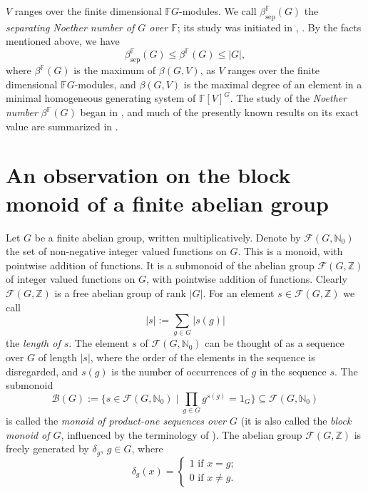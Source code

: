 \documentclass[12pt, oneside]{amsart}
\def\NN{\mathbb{N}}
\def\ZZ{\mathbb{Z}}
\def\FF{\mathbb{F}}
\def\sepbeta{\beta_{\mathrm{sep}}}
\begin{document}
$V$ ranges over the finite dimensional $\FF G$-modules.  We call $\sepbeta^\FF(G)$ the 
\emph{separating Noether number of $G$ over $\FF$}; 
its study was initiated in  \cite{kemper}, \cite{kohls-kraft}.   
By the facts mentioned above, we have 
\begin{equation}\label{eq:sepbeta<beta} 
\sepbeta^\FF(G)\le \beta^\FF(G)\le |G|,
\end{equation} 
where $\beta^\FF(G)$ is the maximum of $\beta(G,V)$, as  
$V$ ranges over the finite dimensional $\FF G$-modules, and 
$\beta(G,V)$ is the maximal degree of an element in a minimal homogeneous generating system 
of $\FF[V]^G$. The study of the \emph{Noether number} 
$\beta^\FF(G)$ began in \cite{schmid}, and much of the presently known results on its exact value 
are summarized in \cite{cziszter-domokos-szollosi}. 

\section{An observation on the block monoid of a finite abelian group}\label{sec:block monoid} 

Let $G$ be a finite abelian group, written multiplicatively. 
Denote by $\mathcal{F}(G,\NN_0)$ the set of non-negative integer valued functions on $G$. This is a monoid, with pointwise addition of functions. 
It is a submonoid of the abelian group $\mathcal{F}(G,\ZZ)$ of integer valued functions on $G$, with pointwise addition of functions. 
Clearly $\mathcal{F}(G,\ZZ)$ is a free abelian group of rank $|G|$. 
For an element $s\in \mathcal{F}(G,\ZZ)$ we call 
\[|s|:=\sum_{g\in G}|s(g)|\]
the \emph{length of $s$}.  
The element $s$ of $\mathcal{F}(G,\NN_0)$ can be thought of as a sequence over $G$ of length $|s|$, 
where the order of the elements in the sequence is disregarded, and $s(g)$ is 
the number of occurrences of $g$ in the sequence $s$. 
The submonoid 
\[\mathcal{B}(G):=\{s\in \mathcal{F}(G,\NN_0)\mid \prod_{g\in G}g^{s(g)}=1_G\}\subseteq \mathcal{F}(G,\NN_0)\] 
is called the \emph{monoid of product-one sequences over $G$} (it is also called 
the \emph{block monoid of $G$}, influenced by the terminology of \cite{narkiewicz}). 
The abelian group $\mathcal{F}(G,\ZZ)$ is freely generated by $\delta_g$, $g\in G$, where 
\begin{equation}\label{eq:delta} \delta_g(x)=\begin{cases} 1 \text{ if }x=g;\\
0 \text{ if }x\neq g.\end{cases}\end{equation} 
\end{document}
